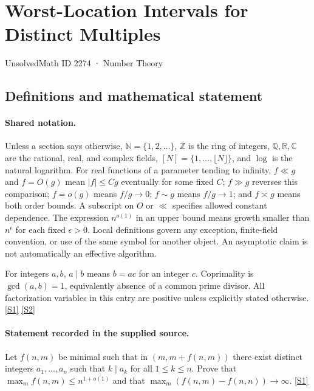\documentclass[11pt,a4paper]{article}
\newcommand{\N}{\mathbb{N}}
\newcommand{\Z}{\mathbb{Z}}
\newcommand{\Q}{\mathbb{Q}}
\newcommand{\R}{\mathbb{R}}
\newcommand{\C}{\mathbb{C}}
\newcommand{\sref}[2]{\hyperlink{source:#1:#2}{[S#2]}}
\begin{document}

\setcounter{section}{2273}

\section{Worst-Location Intervals for Distinct Multiples}\label{2274}

{\small\sffamily UnsolvedMath ID 2274 · Number Theory}

\subsection{Definitions and mathematical statement}

\paragraph{Shared notation.}Unless a section says otherwise, $\N=\{1,2,\ldots\}$,
$\Z$ is the ring of integers, $\Q,\R,\C$ are the rational, real, and complex
fields, $[N]=\{1,\ldots,\lfloor N\rfloor\}$, and $\log$ is the natural
logarithm. For real functions of a parameter tending to infinity,
$f\ll g$ and $f=O(g)$ mean $|f|\leq Cg$ eventually for some fixed $C$;
$f\gg g$ reverses this comparison; $f=o(g)$ means $f/g\to0$;
$f\sim g$ means $f/g\to1$; and $f\asymp g$ means both order bounds.
A subscript on $O$ or $\ll$ specifies allowed constant dependence.
The expression $n^{o(1)}$ in an upper bound means growth smaller than
$n^\epsilon$ for each fixed $\epsilon>0$. Local definitions govern any
exception, finite-field convention, or use of the same symbol for another
object. An asymptotic claim is not automatically an effective algorithm.



For integers $a,b$, $a\mid b$ means $b=ac$ for an integer $c$. Coprimality is $\gcd(a,b)=1$, equivalently absence of a common prime divisor. All factorization variables in this entry are positive unless explicitly stated otherwise. \sref{2274}{1} \sref{2274}{2}

\paragraph{Statement recorded in the supplied source.}
Let $f(n,m)$ be minimal such that in $(m,m+f(n,m))$ there exist distinct integers $a_1,\ldots,a_n$ such that $k\mid a_k$ for all $1\leq k\leq n$. Prove that $ \max_m f(n,m) \leq n^{1+o(1)} $ and that $ \max_m (f(n,m)-f(n,n))\to \infty. $ \sref{2274}{1}
\end{document}
